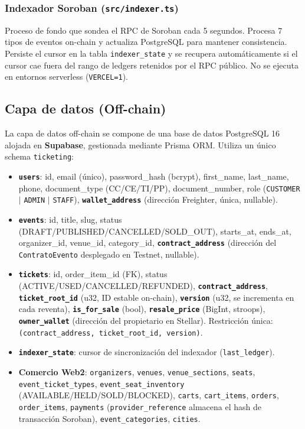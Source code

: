 \documentclass[12pt,oneside]{article}
\begin{document}
\subsubsection{Indexador Soroban (\texttt{src/indexer.ts})}

Proceso de fondo que sondea el RPC de Soroban cada 5 segundos. Procesa 7 tipos de eventos on-chain y actualiza PostgreSQL para mantener consistencia. Persiste el cursor en la tabla \texttt{indexer\_state} y se recupera automáticamente si el cursor cae fuera del rango de ledgers retenidos por el RPC público. No se ejecuta en entornos serverless (\texttt{VERCEL=1}).

\subsection{Capa de datos (Off-chain)}

La capa de datos off-chain se compone de una base de datos PostgreSQL 16 alojada en \textbf{Supabase}, gestionada mediante Prisma ORM. Utiliza un único schema \texttt{ticketing}:

\begin{itemize}
  \item \textbf{\texttt{users}}: id, email (único), password\_hash (bcrypt), first\_name, last\_name, phone, document\_type (CC/CE/TI/PP), document\_number, role (\texttt{CUSTOMER} $|$ \texttt{ADMIN} $|$ \texttt{STAFF}), \textbf{\texttt{wallet\_address}} (dirección Freighter, única, nullable).
  \item \textbf{\texttt{events}}: id, title, slug, status (DRAFT/PUBLISHED/CANCELLED/SOLD\_OUT), starts\_at, ends\_at, organizer\_id, venue\_id, category\_id, \textbf{\texttt{contract\_address}} (dirección del \texttt{ContratoEvento} desplegado en Testnet, nullable).
  \item \textbf{\texttt{tickets}}: id, order\_item\_id (FK), status (ACTIVE/USED/CANCELLED/REFUNDED), \textbf{\texttt{contract\_address}}, \textbf{\texttt{ticket\_root\_id}} (u32, ID estable on-chain), \textbf{\texttt{version}} (u32, se incrementa en cada reventa), \textbf{\texttt{is\_for\_sale}} (bool), \textbf{\texttt{resale\_price}} (BigInt, stroops), \textbf{\texttt{owner\_wallet}} (dirección del propietario en Stellar). Restricción única: \texttt{(contract\_address, ticket\_root\_id, version)}.
  \item \textbf{\texttt{indexer\_state}}: cursor de sincronización del indexador (\texttt{last\_ledger}).
  \item \textbf{Comercio Web2}: \texttt{organizers}, \texttt{venues}, \texttt{venue\_sections}, \texttt{seats}, \texttt{event\_ticket\_types}, \texttt{event\_seat\_inventory} (AVAILABLE/HELD/SOLD/BLOCKED), \texttt{carts}, \texttt{cart\_items}, \texttt{orders}, \texttt{order\_items}, \texttt{payments} (\texttt{provider\_reference} almacena el hash de transacción Soroban), \texttt{event\_categories}, \texttt{cities}.
\end{itemize}
\end{document}
